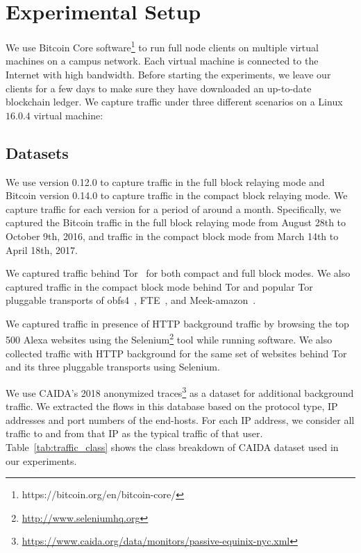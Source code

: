 \section{Experimental Setup}\label{sec:exp-dataset}

We use Bitcoin Core software\footnote{https://bitcoin.org/en/bitcoin-core/} to run full node \bc clients on multiple virtual machines on a campus network. Each virtual machine is connected to the Internet with high bandwidth. Before starting the experiments, we leave our \bc clients for a few days to make sure they have downloaded an up-to-date blockchain ledger.
We capture \bc traffic under three different scenarios on a Linux $16.0.4$ virtual machine: 
\subsection{Datasets}
 We use \bc version 0.12.0 to capture \bc traffic in the full block relaying mode and Bitcoin version 0.14.0 to capture traffic in the compact block relaying mode. We capture \bc traffic for each version for a period of around a month.
Specifically, we captured the Bitcoin traffic in the full block relaying mode from August 28th to October 9th, 2016,  and \bc traffic in the compact block mode from March 14th to April 18th, 2017.

 We captured \bc traffic behind Tor~\cite{tor} for both compact and full block modes.
We also captured \bc traffic in the compact block mode behind %
Tor and popular Tor pluggable transports of obfs4~\cite{obfs4}, FTE~\cite{fte}, and Meek-amazon~\cite{meek}.

 We captured \bc traffic in presence of 
HTTP background traffic by browsing the top 500 Alexa websites using 
the Selenium\footnote{\url{http://www.seleniumhq.org}} tool while running \bc software. We also collected \bc 
traffic with HTTP background for the same set of websites behind Tor and its three pluggable
transports using Selenium.

We use   CAIDA's 2018 anonymized traces\footnote{\url{https://www.caida.org/data/monitors/passive-equinix-nyc.xml}} as a dataset for additional background traffic. 
We extracted the flows in this database based on the protocol type, IP addresses and port numbers of the end-hosts. 
For each IP address, we consider all traffic to and from that IP as the typical traffic of that user. Table~\ref{tab:traffic_class} shows the class breakdown of CAIDA dataset used in our experiments.

